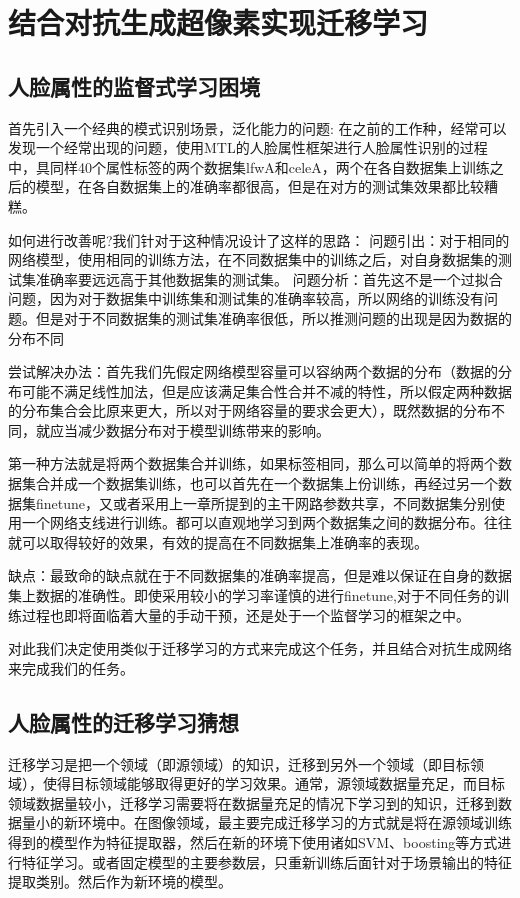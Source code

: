 \section{结合对抗生成超像素实现迁移学习}
\subsection{人脸属性的监督式学习困境}
首先引入一个经典的模式识别场景，泛化能力的问题:
在之前的工作种，经常可以发现一个经常出现的问题，使用MTL的人脸属性框架进行人脸属性识别的过程中，具同样40个属性标签的两个数据集lfwA和celeA，两个在各自数据集上训练之后的模型，在各自数据集上的准确率都很高，但是在对方的测试集效果都比较糟糕。

如何进行改善呢?我们针对于这种情况设计了这样的思路：
问题引出：对于相同的网络模型，使用相同的训练方法，在不同数据集中的训练之后，对自身数据集的测试集准确率要远远高于其他数据集的测试集。
问题分析：首先这不是一个过拟合问题，因为对于数据集中训练集和测试集的准确率较高，所以网络的训练没有问题。但是对于不同数据集的测试集准确率很低，所以推测问题的出现是因为数据的分布不同

尝试解决办法：首先我们先假定网络模型容量可以容纳两个数据的分布（数据的分布可能不满足线性加法，但是应该满足集合性合并不减的特性，所以假定两种数据的分布集合会比原来更大，所以对于网络容量的要求会更大），既然数据的分布不同，就应当减少数据分布对于模型训练带来的影响。

第一种方法就是将两个数据集合并训练，如果标签相同，那么可以简单的将两个数据集合并成一个数据集训练，也可以首先在一个数据集上份训练，再经过另一个数据集finetune，又或者采用上一章所提到的主干网路参数共享，不同数据集分别使用一个网络支线进行训练。都可以直观地学习到两个数据集之间的数据分布。往往就可以取得较好的效果，有效的提高在不同数据集上准确率的表现。

缺点：最致命的缺点就在于不同数据集的准确率提高，但是难以保证在自身的数据集上数据的准确性。即使采用较小的学习率谨慎的进行finetune,对于不同任务的训练过程也即将面临着大量的手动干预，还是处于一个监督学习的框架之中。

对此我们决定使用类似于迁移学习的方式来完成这个任务，并且结合对抗生成网络来完成我们的任务。
\subsection{人脸属性的迁移学习猜想}
迁移学习\cite{TRANSFER}是把一个领域（即源领域）的知识，迁移到另外一个领域（即目标领域），使得目标领域能够取得更好的学习效果。通常，源领域数据量充足，而目标领域数据量较小，迁移学习需要将在数据量充足的情况下学习到的知识，迁移到数据量小的新环境中。在图像领域，最主要完成迁移学习的方式就是将在源领域训练得到的模型作为特征提取器，然后在新的环境下使用诸如SVM、boosting等方式进行特征学习。或者固定模型的主要参数层，只重新训练后面针对于场景输出的特征提取类别。然后作为新环境的模型。

